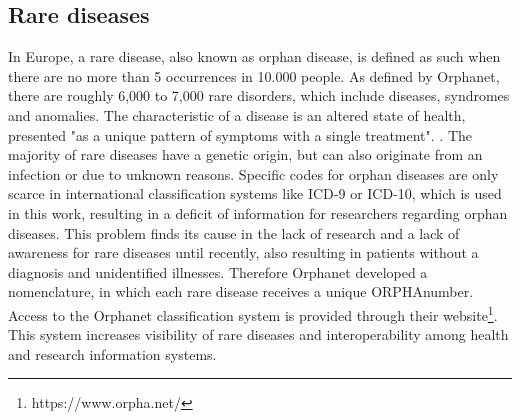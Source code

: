\documentclass[11pt, a4paper]{book}
\begin{document}
\subsection{Rare diseases}
In Europe, a rare disease, also known as orphan disease, is defined as such when there are no more than 5 occurrences in 10.000 people. As defined by Orphanet, there are roughly 6,000 to 7,000 rare disorders, which include diseases, syndromes and anomalies. The characteristic of a disease is an altered state of health, presented "as a unique pattern of symptoms with a single treatment". \cite{Orphanet}. The majority of rare diseases have a genetic origin, but can also originate from an infection or due to unknown reasons. \cite{Orphanet} Specific codes for orphan diseases are only scarce in international classification systems like ICD-9 or ICD-10, which is used in this work, resulting in a deficit of information  for researchers regarding orphan diseases. This problem finds its cause in the lack of research and a lack of awareness for rare diseases until recently, also resulting in patients without a diagnosis and unidentified illnesses. \cite{Orphanet}
Therefore Orphanet developed a nomenclature, in which each rare disease receives a unique ORPHAnumber. Access to the Orphanet classification system is provided through their website\footnote{https://www.orpha.net/}. This system increases visibility of rare diseases and interoperability among health and research information systems. \cite{Orphanet}
\end{document}
